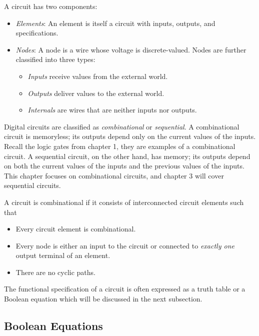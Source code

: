 \documentclass[12pt]{article}
\begin{document}
\newpage

A circuit has two components:

\begin{itemize}
    \item \textit{Elements}: An element is itself a circuit with inputs, outputs, and specifications.
    \item \textit{Nodes}: A node is a wire whose voltage is discrete-valued. Nodes are further classified into three types:
    \begin{itemize}
        \item \textit{Inputs} receive values from the external world.
        \item \textit{Outputs} deliver values to the external world.
        \item \textit{Internals} are wires that are neither inputs nor outputs.
    \end{itemize}
\end{itemize}

Digital circuits are classified as \textit{combinational} or \textit{sequential}. A combinational circuit is memoryless; its outputs depend only on the current values of the inputs. Recall the logic gates from chapter 1, they are examples of a combinational circuit. A sequential circuit, on the other hand, has memory; its outputs depend on both the current values of the inputs and the previous values of the inputs. This chapter focuses on combinational circuits, and chapter 3 will cover sequential circuits.

A circuit is combinational if it consists of interconnected circuit elements such that

\begin{itemize}
    \item Every circuit element is combinational.
    \item Every node is either an input to the circuit or connected to \textit{exactly one} output terminal of an element.
    \item There are no cyclic paths.
\end{itemize}

The functional specification of a circuit is often expressed as a truth table or a Boolean equation which will be discussed in the next subsection.

\subsection{Boolean Equations}
\end{document}
